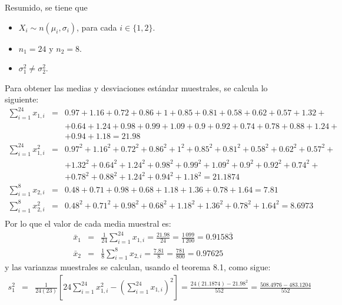 \begin{solucion}
 \begin{datos}
  Resumido, se tiene que
  \begin{itemize}
   \item $X_i \sim n\left( \mu_i, \sigma_i \right)$,
   para cada $i \in \{ 1, 2 \}$.
   \item $n_1 = 24$ y $n_2 = 8$.
   \item $\sigma_1^2 \neq \sigma_2^2$.
  \end{itemize}
  Para obtener las medias y desviaciones est\'andar muestrales,
  se calcula lo siguiente:
  \begin{eqnarray*}
   \sum_{i=1}^{24} x_{1,i} & = &
   0.97 + 1.16 + 0.72 + 0.86 + 1 + 0.85 + 0.81 + 0.58 + 0.62 + 0.57 +
   1.32 + \\
   & & + 0.64 + 1.24 + 0.98 + 0.99 + 1.09 + 0.9 + 0.92 + 0.74 + 0.78
   + 0.88 + 1.24 + \\
   & & + 0.94 + 1.18 = 21.98 \\
   \sum_{i=1}^{24} x_{1,i}^2 & = &
   0.97^2 + 1.16^2 + 0.72^2 + 0.86^2 + 1^2 + 0.85^2 + 0.81^2 +
   0.58^2 + 0.62^2 + 0.57^2 + \\
   & & + 1.32^2 + 0.64^2 + 1.24^2 + 0.98^2 + 0.99^2 + 1.09^2 + 0.9^2
   + 0.92^2 + 0.74^2 + \\
   & & + 0.78^2 + 0.88^2 + 1.24^2 + 0.94^2 + 1.18^2
   = 21.1874 \\
   \sum_{i=1}^8 x_{2,i} & = &
   0.48 + 0.71 + 0.98 + 0.68 + 1.18 + 1.36 + 0.78 + 1.64 =
   7.81 \\
   \sum_{i=1}^8 x_{2,i}^2 & = &
   0.48^2 + 0.71^2 + 0.98^2 + 0.68^2 + 1.18^2 + 1.36^2 + 0.78^2
   + 1.64^2 = 8.6973 \\
  \end{eqnarray*}
  Por lo que el valor de cada media muestral es:
  \begin{eqnarray*}
   \bar{x}_1 & = & \frac{1}{24} \sum_{i=1}^{24} x_{1,i}
   = \frac{21.98}{24} = \frac{1\,099}{1\,200} = 0.9158\overline{3} \\
   \bar{x}_2 & = & \frac{1}{8} \sum_{i=1}^{8} x_{2,i}
   = \frac{7.81}{8} = \frac{781}{800} = 0.97625
  \end{eqnarray*}
  y las varianzas muestrales se calculan, usando el teorema 8.1,
  como sigue:
  \begin{eqnarray*}
   s_1^2 & = &
   \frac{1}{24(23)}
   \left[
   24\sum_{i=1}^{24}x_{1,i}^2-\left( \sum_{i=1}^{24}x_{1,i} \right)^2
   \right]
   = \frac{24(21.1874) - 21.98^2}{552}
   = \frac{508.4976 - 483.1204}{552} \\

\end{eqnarray*}
\end{datos}
\end{solucion}
